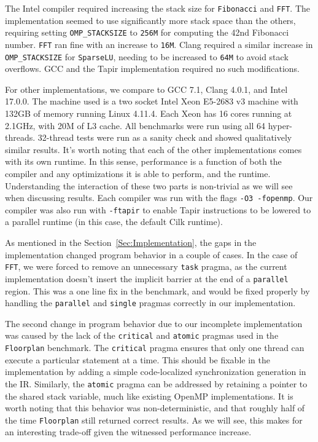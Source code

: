 \documentclass[sigconf]{acmart}
\begin{document}
The Intel compiler required increasing the stack size for \texttt{Fibonacci} and
\texttt{FFT}. The implementation seemed to use significantly more stack space
than the others, requiring setting \texttt{OMP\_STACKSIZE} to \texttt{256M} for
computing the 42nd Fibonacci number. \texttt{FFT} ran fine with an increase to
\texttt{16M}. Clang required a similar increase in \texttt{OMP\_STACKSIZE} for
\texttt{SparseLU}, needing to be increased to \texttt{64M} to avoid stack
overflows. GCC and the Tapir implementation required no such modifications. 

For other implementations, we compare to GCC 7.1, Clang 4.0.1, and Intel
17.0.0. The machine used is a two socket Intel Xeon E5-2683 v3 machine with
132GB of memory running Linux 4.11.4. Each Xeon has 16 cores running at
2.1GHz, with 20M of L3 cache. All benchmarks were run using all 64
hyper-threads. 32-thread tests were run as a sanity check and showed
qualitatively similar results. It's worth noting that each of the other
implementations comes with its own runtime. In this sense, performance is a
function of both the compiler and any optimizations it is able to perform, and
the runtime.  Understanding the interaction of these two parts is non-trivial
as we will see when discussing results. Each compiler was run with the flags
\texttt{-O3 -fopenmp}. Our compiler was also run with \texttt{-ftapir} to
enable Tapir instructions to be lowered to a parallel runtime (in this case,
the default Cilk runtime).

As mentioned in the Section~\ref{Sec:Implementation}, the gaps in the implementation
changed program behavior in a couple of cases. In the case of \texttt{FFT}, we were
forced to remove an unnecessary \texttt{task} pragma, as the current implementation
doesn't insert the implicit barrier at the end of a \texttt{parallel} region. This 
was a one line fix in the benchmark, and would be fixed properly by handling
the \texttt{parallel} and \texttt{single} pragmas correctly in our implementation. 

The second change in program behavior due to our incomplete implementation was
caused by the lack of the \texttt{critical} and \texttt{atomic} pragmas used
in the \texttt{Floorplan} benchmark. The \texttt{critical} pragma
ensures that only one thread can execute a particular statement at a time. 
This should be fixable in the implementation by adding a simple code-localized
synchronization generation in the IR\@. Similarly, the \texttt{atomic} pragma 
can be addressed by retaining a pointer to the shared stack variable, much like
existing OpenMP implementations. It is worth noting that this behavior was
non-deterministic, and that roughly half of the time \texttt{Floorplan}
still returned correct results. As we will see, this makes for an interesting
trade-off given the witnessed performance increase.
\end{document}
